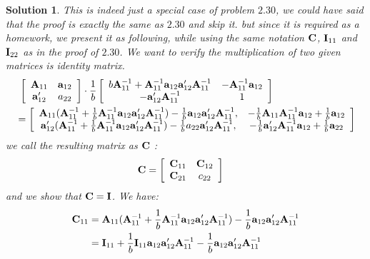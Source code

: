 \documentclass[11pt]{article}\usepackage[]{graphicx}\usepackage[]{color}
\newtheorem{sol}{Solution}
\begin{document}
\begin{sol}
	This is indeed just a special case of problem $2.30$, we could have said that the proof is exactly the same as $2.30$ and skip it. but since it is required as a homework, we present it as following, while using the same notation ${\bf C}$, ${\bf I}_{11}$ and ${\bf I}_{22}$ as in the proof of $2.30$.\vskip 2mm
	We want to verify the multiplication of two given matrices is identity matrix.
	\begin{align*}
		&\ \left[\begin{array}{cc} {\bf A}_{11}& {\bf a}_{12}\\ {\bf a}'_{12}& a_{22}\end{array}\right]\cdot  \frac{1}{b}\left[\begin{array}{cc} b{\bf A}_{11}^{-1} + {\bf A}_{11}^{-1}{\bf a}_{12}{\bf a}'_{12}{\bf A}_{11}^{-1}& -{\bf A}_{11}^{-1}{\bf a}_{12}\\ -{\bf a}'_{12}{\bf A}_{11}^{-1}& 1\end{array}\right]\\
		&= \left[\begin{array}{cc} {\bf A}_{11}({\bf A}_{11}^{-1} + \frac{1}{b}{\bf A}_{11}^{-1}{\bf a}_{12}{\bf a}_{12}'{\bf A}_{11}^{-1}) - \frac{1}{b}{\bf a}_{12}{\bf a}'_{12}{\bf A}_{11}^{-1}, & -\frac{1}{b}{\bf A}_{11}{\bf A}_{11}^{-1}{\bf a}_{12} +\frac{1}{b}{\bf a}_{12}\\ {\bf a}'_{12}({\bf A}_{11}^{-1} + \frac{1}{b}{\bf A}_{11}^{-1}{\bf a}_{12}{\bf a}'_{12}{\bf A}_{11}^{-1}) - \frac{1}{b}a_{22}{\bf a}'_{12}{\bf A}_{11}^{-1},& -\frac{1}{b}{\bf a}'_{12}{\bf A}_{11}^{-1}{\bf a}_{12} + \frac{1}{b}{\bf a}_{22}\end{array}\right]
	\end{align*}
	we call the resulting matrix as ${\bf C}$ :
	\begin{align*}
		{\bf C} &= \left[\begin{array}{cc} {\bf C}_{11}& {\bf C}_{12}\\ {\bf C}_{21}& c_{22}\end{array}\right]
	\end{align*}
	and we show that ${\bf C} = {\bf I}$.\vskip 2mm
	We have:
	\begin{align*}
		{\bf C}_{11} &= {\bf A}_{11}({\bf A}_{11}^{-1} + \frac{1}{b}{\bf A}_{11}^{-1}{\bf a}_{12}{\bf a}_{12}'{\bf A}_{11}^{-1}) - \frac{1}{b}{\bf a}_{12}{\bf a}'_{12}{\bf A}_{11}^{-1}\\
		&= {\bf I}_{11} + \frac{1}{b}{\bf I}_{11}{\bf a}_{12}{\bf a}'_{12}{\bf A}_{11}^{-1} - \frac{1}{b}{\bf a}_{12}{\bf a}_{12}'{\bf A}_{11}^{-1}\\

\end{align*}
\end{sol}
\end{document}
